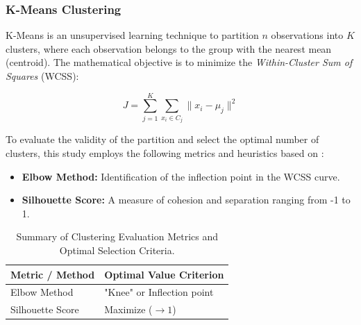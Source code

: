         
\subsubsection{K-Means Clustering %
}

K-Means is an unsupervised learning technique to partition $n$ observations into $K$ clusters, where each observation belongs to the group with the nearest mean (centroid). The mathematical objective is to minimize the \textit{Within-Cluster Sum of Squares} (WCSS):

\begin{equation}
    J = \sum_{j=1}^{K} \sum_{x_i \in C_j} \|x_i - \mu_j\|^2
\end{equation}

To evaluate the validity of the partition and select the optimal number of clusters, this study employs the following metrics and heuristics based on \cite{Naeem2023}:

\begin{itemize} 
    \item \textbf{Elbow Method:} Identification of the inflection point in the WCSS curve.
    \item \textbf{Silhouette Score:} A measure of cohesion and separation ranging from -1 to 1.
\end{itemize}

\begin{table}[htbp]
\centering
\caption{Summary of Clustering Evaluation Metrics and Optimal Selection Criteria.}
\label{tab:clustering_metrics_simple}
\begin{tabular}{@{}ll@{}}
\toprule
\textbf{Metric / Method} & \textbf{Optimal Value Criterion} \\ \midrule
Elbow Method             & "Knee" or Inflection point       \\
Silhouette Score         & Maximize ($\to 1$)               \\
\bottomrule
\end{tabular}
\end{table}

